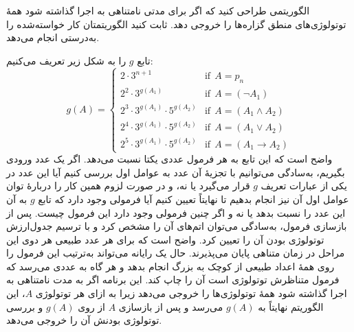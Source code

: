 الگوریتمی طراحی کنید که اگر برای مدتی نامتناهی به اجرا گذاشته شود همهٔ توتولوژی‌های منطق گزاره‌ها را خروجی دهد. ثابت کنید الگوریتمتان کار خواسته‌شده را به‌درستی انجام می‌دهد.
\begin{ans}
تابع $g$ را به شکل زیر تعریف می‌کنیم:
$$
g(A)=
\begin{cases}
2\cdot 3^{n+1} & \text{if}~~A = p_n\\
2^2\cdot 3^{g(A_1)} & \text{if}~~A=(\neg A_1)\\
2^3\cdot 3^{g(A_1)}\cdot 5^{g(A_2)} & \text{if}~~A=(A_1\wedge A_2) \\
2^4\cdot 3^{g(A_1)}\cdot 5^{g(A_2)} & \text{if}~~A=(A_1\vee A_2) \\
2^5\cdot 3^{g(A_1)}\cdot 5^{g(A_2)} & \text{if}~~A=(A_1\rightarrow A_2)
\end{cases}
$$
واضح است که این تابع به هر فرمول عددی یکتا نسبت می‌دهد. اگر یک عدد ورودی بگیریم، به‌سادگی می‌توانیم با تجزیهٔ آن عدد به عوامل اول بررسی کنیم آیا این عدد در یکی از عبارات تعریف $g$ قرار می‌گیرد یا نه، و در صورت لزوم همین کار را دربارهٔ توان عوامل اول آن نیز انجام بدهیم تا نهایتاً تعیین کنیم آیا فرمولی وجود دارد که تابع $g$ به آن این عدد را نسبت بدهد یا نه و اگر چنین فرمولی وجود دارد این فرمول چیست. پس از بازسازی فرمول، به‌سادگی می‌توان اتم‌های آن را مشخص کرد و با ترسیم جدول‌ارزش توتولوژی بودن آن را تعیین کرد. واضح است که برای هر عدد طبیعی هر دوی این مراحل در زمان متناهی پایان می‌پذیرند. حال یک رایانه می‌تواند به‌ترتیب این فرمول را روی همهٔ اعداد طبیعی از کوچک به بزرگ انجام بدهد و هر گاه به عددی می‌رسد که فرمول متناظرش توتولوژی است آن را چاپ کند. این برنامه اگر به مدت نامتناهی به اجرا گذاشته شود همهٔ توتولوژی‌ها را خروجی می‌دهد زیرا به ازای هر توتولوژی $A$، این الگوریتم نهایتاً به
$g(A)$
می‌رسد و پس از بازسازی $A$ از روی $g(A)$ و بررسی توتولوژی بودنش آن را خروجی می‌دهد.
\end{ans}
